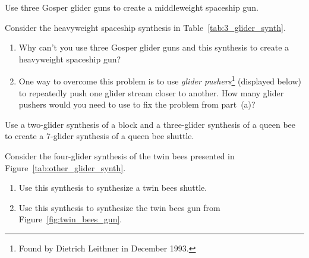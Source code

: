 \begin{multicols}{2}
\mfilbreak


\begin{problem}\label{exer:mwss_gun}
	Use three Gosper glider guns to create a middleweight spaceship gun.
\end{problem}


\mfilbreak


\begin{problem}\label{exer:hwss_gun}
	Consider the heavyweight spaceship synthesis in Table~\ref{tab:3_glider_synth}.
	\begin{enumerate}[label=\bf\color{ocre}(\alph*)]
		\item Why can't you use three Gosper glider guns and this synthesis to create a heavyweight spaceship gun?
		
		\item One way to overcome this problem is to use \emph{glider pushers}\footnote{Found by Dietrich Leithner in December 1993.} (displayed below) to repeatedly push one glider stream closer to another. How many glider pushers would you need to use to fix the problem from part~(a)?\smallskip
				
		\begin{minipage}{\linewidth}
			\centering
		\end{minipage}
	\end{enumerate}
\end{problem}


\mfilbreak


\begin{problem}\label{exer:queen_bee_synth}
	Use a two-glider synthesis of a block and a three-glider synthesis of a queen bee to create a $7$-glider synthesis of a queen bee shuttle.
\end{problem}


\mfilbreak


\begin{problem}\label{exer:twin_bee_shuttle_synth}
	Consider the four-glider synthesis of the twin bees presented in Figure~\ref{tab:other_glider_synth}.\smallskip
	
	\begin{enumerate}[label=\bf\color{ocre}(\alph*)]
		\item Use this synthesis to synthesize a twin bees shuttle.
		
		\item Use this synthesis to synthesize the twin bees gun from Figure~\ref{fig:twin_bees_gun}.
	\end{enumerate}
\end{problem}



\end{multicols}
